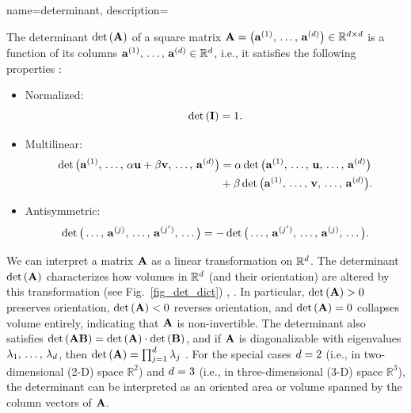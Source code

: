 {name={determinant},
	description={The determinant $\det\,({\bf A})$ of a square \gls{matrix} 
		$\mA =\linebreak \big( \va^{(1)},\,\ldots,\,\va^{(\nrfeatures)} \big) \in \mathbb{R}^{\nrfeatures \times \nrfeatures}$ is a 
		\gls{function} of its columns ${\bf a}^{(1)},\,\ldots,\,{\bf a}^{(d)} \in \mathbb{R}^{d}$, i.e., it satisfies 
		the following properties \cite{DirschmidHansJorg1996TuF}:
		\begin{itemize}
			\item Normalized: $$\det\,(\mathbf{I}) = 1.$$ 
			\item Multilinear: \begin{align} \nonumber \det \big({\bf a}^{(1)},\,\ldots,\,\alpha{\bf u}+ \beta {\bf v},\,\ldots,\,{\bf a}^{(d)} \big) & = \alpha\det \big({\bf a}^{(1)},\,\ldots,\,{\bf u},\,\ldots,\,{\bf a}^{(d)} \big) \\ 
			& +\beta\det \big({\bf a}^{(1)},\,\ldots,\,{\bf v},\,\ldots,\,{\bf a}^{(d)} \big). \nonumber
			\end{align}
			\item Antisymmetric: $$\det \big(\ldots,\,{\bf a}^{(j)}, \,\ldots, \,{\bf a}^{(j')},\,\ldots \big) = - \det \big(\ldots,\,{\bf a}^{(j')}, \,\ldots, \,{\bf a}^{(j)},\,\ldots \big).$$ 
		\end{itemize} 
		We can interpret a \gls{matrix} ${\bf A}$ as a linear transformation on $\mathbb{R}^{d}$.
		The determinant $\det\,({\bf A})$ characterizes how volumes in $\mathbb{R}^d$ (and their orientation) 
		are altered by this transformation (see Fig.\ \ref{fig_det_dict}) \cite{GolubVanLoanBook}, \cite{Strang2007}. 
 		In particular, $\det\,({\bf A}) > 0$ preserves orientation, $\det\,({\bf A}) < 0$ reverses orientation, 
 		and $\det\,({\bf A}) = 0$ collapses volume entirely, indicating that ${\bf A}$ is non-\gls{invertible}. 
 		The determinant also satisfies $\det\,({\bf A} {\bf B}) = \det\,({\bf A}) \cdot \det\,({\bf B})$, and if ${\bf A}$ is 
 		\gls{diagonalizable} with \glspl{eigenvalue} $\lambda_{1}, \,\ldots, \,\lambda_{d}$, then 
		$\det\,({\bf A}) = \prod_{j=1}^{d} \lambda_{j}$ \cite{HornMatAnalysis}.
    		For the special cases $d=2$ (i.e., in two-dimensional (2-D) space $\mathbb{R}^{2}$) and 
		$d=3$ (i.e., in three-dimensional (3-D) space $\mathbb{R}^{3}$), 
		the determinant can be interpreted as an oriented area or volume spanned by the column \glspl{vector} of ${\bf A}$.
    		\begin{figure}[H]

\end{figure}}}
